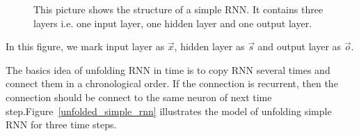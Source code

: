 \documentclass[officiallayout]{tktla}
\begin{document}
\begin{figure}[h!]
  \caption{This picture shows the structure of a simple RNN. It contains three layers i.e. one input layer, one hidden layer and one output layer.}\label{simple_rnn}
\end{figure}

In this figure, we mark input layer as $\vec{x}$, hidden layer as $\vec{s}$ and output layer as $\vec{o}$.

The basics idea of unfolding RNN in time is to copy RNN several times and connect them in a chronological order. If the connection is recurrent, then the connection should be connect to the same neuron of next time step.Figure~\ref{unfolded_simple_rnn} illustrates the model of unfolding simple RNN  for three time steps.
\end{document}

